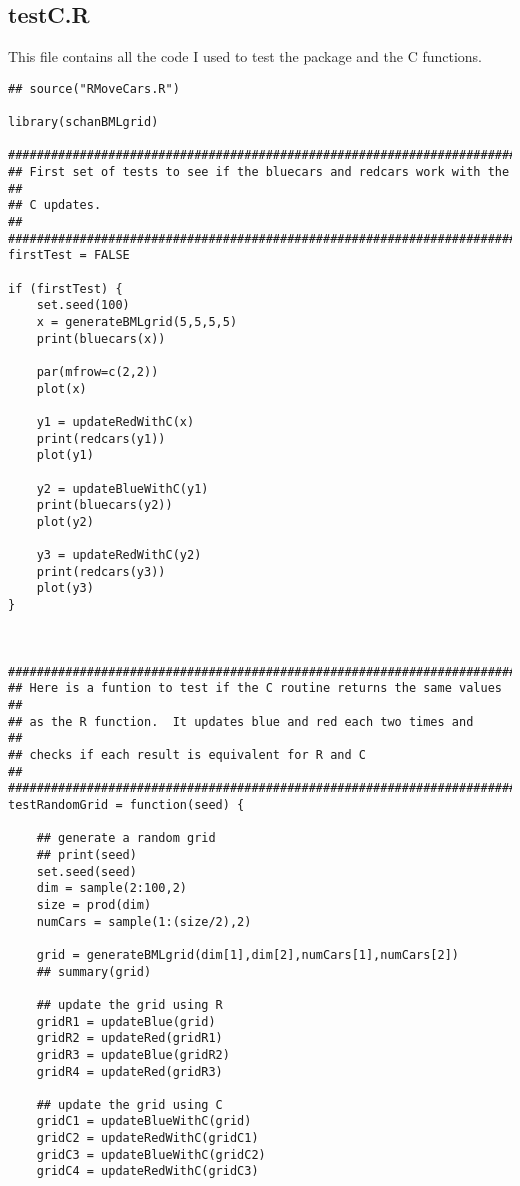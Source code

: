 \documentclass[11pt]{article}
\begin{document}
\subsection{testC.R}
\label{sec-4-5}

   This file contains all the code I used to test the package and the
   C functions.

\begin{verbatim}
## source("RMoveCars.R")

library(schanBMLgrid)

#########################################################################
## First set of tests to see if the bluecars and redcars work with the ##
## C updates.                                                          ##
#########################################################################
firstTest = FALSE

if (firstTest) {
    set.seed(100)
    x = generateBMLgrid(5,5,5,5)
    print(bluecars(x))

    par(mfrow=c(2,2))
    plot(x)

    y1 = updateRedWithC(x)
    print(redcars(y1))
    plot(y1)

    y2 = updateBlueWithC(y1)
    print(bluecars(y2))
    plot(y2)

    y3 = updateRedWithC(y2)
    print(redcars(y3))
    plot(y3)
}



########################################################################
## Here is a funtion to test if the C routine returns the same values ##
## as the R function.  It updates blue and red each two times and     ##
## checks if each result is equivalent for R and C                    ##
########################################################################
testRandomGrid = function(seed) {

    ## generate a random grid
    ## print(seed)
    set.seed(seed)
    dim = sample(2:100,2)
    size = prod(dim)
    numCars = sample(1:(size/2),2)

    grid = generateBMLgrid(dim[1],dim[2],numCars[1],numCars[2])
    ## summary(grid)

    ## update the grid using R
    gridR1 = updateBlue(grid)
    gridR2 = updateRed(gridR1)
    gridR3 = updateBlue(gridR2)
    gridR4 = updateRed(gridR3)

    ## update the grid using C
    gridC1 = updateBlueWithC(grid)
    gridC2 = updateRedWithC(gridC1)
    gridC3 = updateBlueWithC(gridC2)
    gridC4 = updateRedWithC(gridC3)


\end{verbatim}
\end{document}
